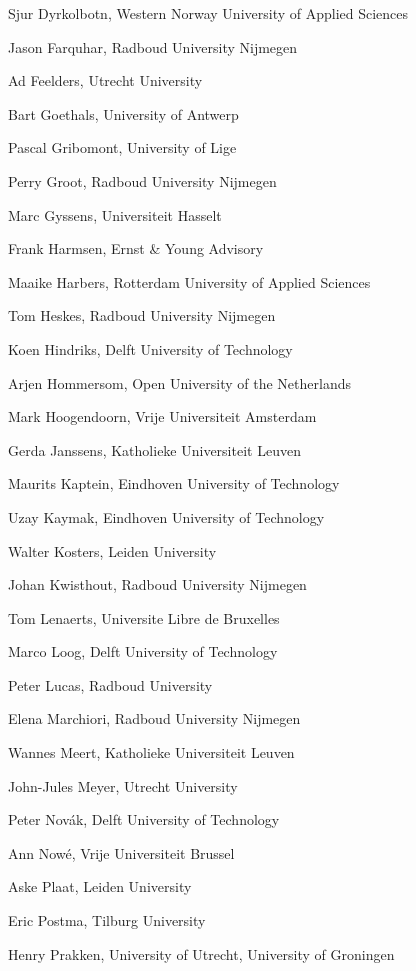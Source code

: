 \documentclass[a4paper,oneside]{book}
\begin{document}
\begin{compactitem}[]
		\item[] Sjur Dyrkolbotn, Western Norway University of Applied Sciences
		\item[] Jason Farquhar, Radboud University Nijmegen
		\item[] Ad Feelders, Utrecht University
		\item[] Bart Goethals, University of Antwerp
		\item[] Pascal Gribomont, University of Lige
		\item[] Perry Groot, Radboud University Nijmegen
		\item[] Marc Gyssens, Universiteit Hasselt
		\item[] Frank Harmsen, Ernst \& Young Advisory
		\item[] Maaike Harbers, Rotterdam University of Applied Sciences
		\item[] Tom Heskes, Radboud University Nijmegen
		\item[] Koen Hindriks, Delft University of Technology
		\item[] Arjen Hommersom, Open University of the Netherlands
		\item[] Mark Hoogendoorn, Vrije Universiteit Amsterdam
		\item[] Gerda Janssens, Katholieke Universiteit Leuven
		\item[] Maurits Kaptein, Eindhoven University of Technology
		\item[] Uzay Kaymak, Eindhoven University of Technology
		\item[] Walter Kosters, Leiden University
		\item[] Johan Kwisthout, Radboud University Nijmegen
		\item[] Tom Lenaerts, Universite Libre de Bruxelles
		\item[] Marco Loog, Delft University of Technology
		\item[] Peter Lucas, Radboud University
		\item[] Elena Marchiori, Radboud University Nijmegen
		\item[] Wannes Meert, Katholieke Universiteit Leuven
		\item[] John-Jules Meyer, Utrecht University
		\item[] Peter Nov\'ak, Delft University of Technology
		\item[] Ann Now\'e, Vrije Universiteit Brussel
		\item[] Aske Plaat, Leiden University
		\item[] Eric Postma, Tilburg University
		\item[] Henry Prakken, University of Utrecht, University of Groningen

\end{compactitem}
\end{document}

